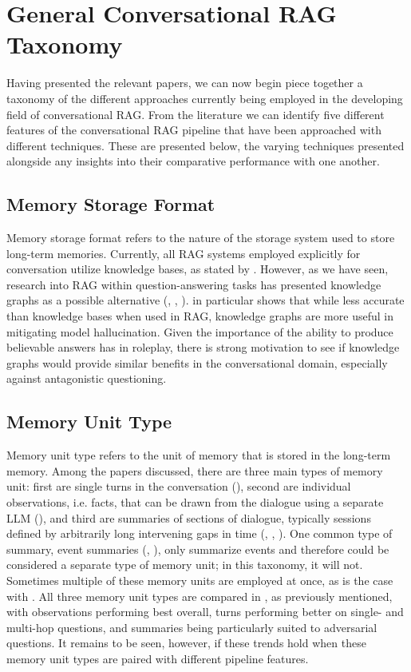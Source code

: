 \section{General Conversational RAG Taxonomy}

Having presented the relevant papers, we can now begin piece together a taxonomy of the different approaches currently being employed in the developing field of conversational RAG. From the literature we can identify five different features of the conversational RAG pipeline that have been approached with different techniques. These are presented below, the varying techniques presented alongside any insights into their comparative performance with one another.


\subsection{Memory Storage Format}

Memory storage format refers to the nature of the storage system used to store long-term memories. Currently, all RAG systems employed explicitly for conversation utilize knowledge bases, as stated by \cite{Hatalis2024}. However, as we have seen, research into RAG within question-answering tasks has presented knowledge graphs as a possible alternative (\cite{Sanmartin2024}, \cite{Guan2023}, \cite{Yang2024}). \cite{Sanmartin2024} in particular shows that while less accurate than knowledge bases when used in RAG, knowledge graphs are more useful in mitigating model hallucination. Given the importance of the ability to produce believable answers has in roleplay, there is strong motivation to see if knowledge graphs would provide similar benefits in the conversational domain, especially against antagonistic questioning.


\subsection{Memory Unit Type}

Memory unit type refers to the unit of memory that is stored in the long-term memory. Among the papers discussed, there are three main types of memory unit: first are single turns in the conversation (\cite{Park2023}), second are individual observations, i.e. facts, that can be drawn from the dialogue using a separate LLM (\cite{Maharana2024}), and third are summaries of sections of dialogue, typically sessions defined by arbitrarily long intervening gaps in time (\cite{Maharana2024}, \cite{Zhong2023}, \cite{Li2024}). One common type of summary, event summaries (\cite{Zhong2023}, \cite{Li2024}), only summarize events and therefore could be considered a separate type of memory unit; in this taxonomy, it will not. Sometimes multiple of these memory units are employed at once, as is the case with \cite{Zhong2023}. All three memory unit types are compared in \cite{Maharana2024}, as previously mentioned, with observations performing best overall, turns performing better on single- and multi-hop questions, and summaries being particularly suited to adversarial questions. It remains to be seen, however, if these trends hold when these memory unit types are paired with different pipeline features.


